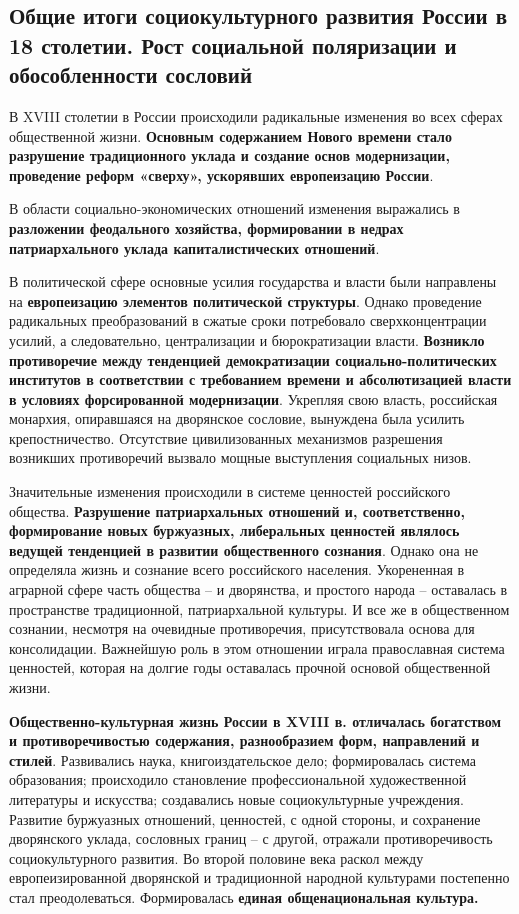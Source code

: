 \documentclass{article}
\begin{document}
\subsection{Общие итоги социокультурного развития России в 18 столетии. Рост социальной поляризации и обособленности сословий}

В XVIII столетии в России происходили радикальные изменения во всех сферах общественной жизни. \textbf{Основным содержанием Нового времени стало разрушение традиционного уклада и создание основ модернизации, проведение реформ «сверху», ускорявших европеизацию России}.

\hfill

В области социально-экономических отношений изменения выражались в \textbf{разложении феодального хозяйства, формировании в недрах патриархального уклада капиталистических отношений}.

В политической сфере основные усилия государства и власти были направлены на \textbf{европеизацию элементов политической структуры}. Однако проведение радикальных преобразований в сжатые сроки потребовало сверхконцентрации усилий, а следовательно, централизации и бюрократизации власти. \textbf{Возникло противоречие между тенденцией демократизации социально-политических институтов в соответствии с требованием времени и абсолютизацией власти в условиях форсированной модернизации}. Укрепляя свою власть, российская монархия, опиравшаяся на дворянское сословие, вынуждена была усилить крепостничество. Отсутствие цивилизованных механизмов разрешения возникших противоречий вызвало мощные выступления социальных низов.

\hfill

Значительные изменения происходили в системе ценностей российского общества. \textbf{Разрушение патриархальных отношений и, соответственно, формирование новых буржуазных, либеральных ценностей являлось ведущей тенденцией в развитии общественного сознания}. Однако она не определяла жизнь и сознание всего российского населения. Укорененная в аграрной сфере часть общества – и дворянства, и простого народа – оставалась в пространстве традиционной, патриархальной культуры. И все же в общественном сознании, несмотря на очевидные противоречия, присутствовала основа для консолидации. Важнейшую роль в этом отношении играла православная система ценностей, которая на долгие годы оставалась прочной основой общественной жизни.

\hfill

\textbf{Общественно-культурная жизнь России в XVIII в. отличалась богатством и противоречивостью содержания, разнообразием форм, направлений и стилей}. Развивались наука, книгоиздательское дело; формировалась система образования; происходило становление профессиональной художественной литературы и искусства; создавались новые социокультурные учреждения. Развитие буржуазных отношений, ценностей, с одной стороны, и сохранение дворянского уклада, сословных границ – с другой, отражали противоречивость социокультурного развития. Во второй половине века раскол между европеизированной дворянской и традиционной народной культурами постепенно стал преодолеваться. Формировалась \textbf{единая общенациональная культура.
}
\end{document}
